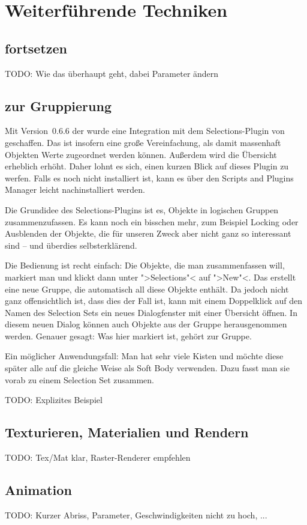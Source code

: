 \documentclass[10pt,DIV=14,a4paper]{scrartcl}
\begin{document}


\pagebreak
\section{Weiterführende Techniken}

\subsection{ fortsetzen}
TODO: Wie das überhaupt geht, dabei Parameter ändern

\subsection{ zur Gruppierung}
Mit Version~0.6.6 der \fluidsim wurde eine Integration mit dem
Selections-Plugin von \aoi geschaffen. Das ist insofern eine große
Vereinfachung, als damit massenhaft Objekten Werte zugeordnet werden
können. Außerdem wird die Übersicht erheblich erhöht. Daher lohnt es
sich, einen kurzen Blick auf dieses Plugin zu werfen. Falls es noch
nicht installiert ist, kann es über den Scripts and Plugins Manager
leicht nachinstalliert werden.

Die Grundidee des Selections-Plugins ist es, Objekte in logischen
Gruppen zusammenzufassen. Es kann noch ein bisschen mehr, zum Beispiel
Locking oder Ausblenden der Objekte, die für unseren Zweck aber nicht
ganz so interessant sind -- und überdies selbst\-er\-klä\-rend.

Die Bedienung ist recht einfach: Die Objekte, die man zusammenfassen
will, markiert man und klickt dann unter ">Selections"< auf ">New"<. Das
erstellt eine neue Gruppe, die automatisch all diese Objekte enthält. Da
jedoch nicht ganz offensichtlich ist, dass dies der Fall ist, kann mit
einem Doppelklick auf den Namen des Selection Sets ein neues
Dialogfenster mit einer Übersicht öffnen. In diesem neuen Dialog können
auch Objekte aus der Gruppe herausgenommen werden. Genauer gesagt: Was
hier markiert ist, gehört zur Gruppe.

Ein möglicher Anwendungsfall: Man hat sehr viele Kisten und möchte diese
später alle auf die gleiche Weise als Soft Body verwenden. Dazu fasst
man sie vorab zu einem Selection Set zusammen.

TODO: Explizites Beispiel

\subsection{Texturieren, Materialien und Rendern}
TODO: Tex/Mat klar, Raster-Renderer empfehlen

\subsection{Animation}
TODO: Kurzer Abriss, Parameter, Geschwindigkeiten nicht zu hoch, ...

\end{document}

